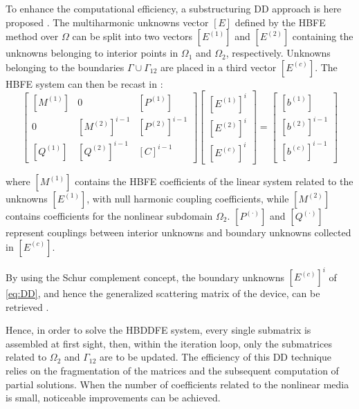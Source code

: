 \documentclass[journal]{IEEEtran}
\begin{document}
To enhance the computational efficiency, a substructuring DD
approach is here proposed \cite{Guarnieri2010,Guarnieri2009}. The multiharmonic
unknowns vector $[E]$ defined by the HBFE method over $\Omega$ can be split
into two vectors $[E^{(1)}]$ and $[E^{(2)}]$ containing the unknowns belonging
to interior points in $\Omega_1$ and $\Omega_2$, respectively. Unknowns
belonging to the boundaries $\Gamma\cup\Gamma_{12}$ are placed in a third
vector $[E^{(c)}]$. The HBFE system can then be recast in :
%
\begin{equation}\label{eq:DD}
\begin{bmatrix}
 [M^{(1)}] &  \!\!0\!\!  &  [P^{(1)}] \\
 0  &  \!\![M^{(2)}]^{i-1}\!\! & [P^{(2)}]^{i-1} \\
 [Q^{(1)}] & \!\![Q^{(2)}]^{i-1}\!\! & [C]^{i-1}
\end{bmatrix}
\!\!\!\!
\begin{bmatrix}
{[E^{(1)}]^{i}} \\
{[E^{(2)}]^{i}} \\
{[E^{(c)}]^{i}}
\end{bmatrix} 
\!\!\!=\!\!\!
\begin{bmatrix}
{[b^{(1)}]} \\
{[b^{(2)}]}^{i-1} \\
{[b^{(c)}]}^{i-1}
\end{bmatrix} 
\end{equation}

\noindent where $[M^{(1)}]$ contains the HBFE coefficients of the linear system
related to the unknowns $[E^{(1)}]$, with
null harmonic coupling coefficients, while $[M^{(2)}]$ contains coefficients for
the nonlinear subdomain $\Omega_2$. ${[P^{(\cdot)}]}$ and ${[Q^{(\cdot)}]}$
represent couplings between interior unknowns and 
boundary unknowns collected in $[E^{(c)}]$. 

By using the Schur complement concept, the boundary unknowns $[E^{(c)}]^{i}$ of
\eqref{eq:DD}, and hence the generalized scattering matrix of the device, can be retrieved 
\cite{Guarnieri2010, Guarnieri2009}.

Hence, in order to solve the HBDDFE system,
every single submatrix is assembled at first sight, then, within the iteration
loop, only the submatrices related to $\Omega_2$ and $\Gamma_{12}$ are to be
updated. The efficiency of this 
DD technique relies on the fragmentation of the
matrices and the subsequent computation of partial solutions. When the number
of coefficients related to the nonlinear media is small, noticeable
improvements can be achieved.
\end{document}
